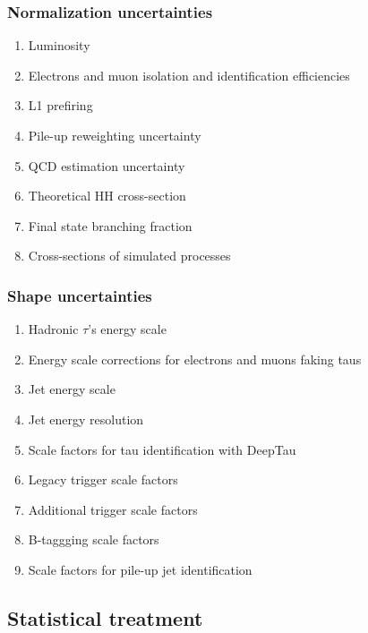 \documentclass[11pt]{article}
\begin{document}
\subsubsection{Normalization uncertainties}
\label{sec:org8d513f2}
\begin{enumerate}
\item Luminosity
\label{sec:org83c907c}
\item Electrons and muon isolation and identification efficiencies
\label{sec:orgbbc8293}
\item L1 prefiring
\label{sec:org8aad313}
\item Pile-up reweighting uncertainty
\label{sec:orgc70221e}
\item QCD estimation uncertainty
\label{sec:orgf3ca5a8}
\item Theoretical HH cross-section
\label{sec:orgd7659c6}
\item Final state branching fraction
\label{sec:org4a89f74}
\item Cross-sections of simulated processes
\label{sec:orgd0b0c73}
\end{enumerate}
\subsubsection{Shape uncertainties}
\label{sec:orgf576437}
\begin{enumerate}
\item Hadronic \(\tau\)'s energy scale
\label{sec:org02578de}
\item Energy scale corrections for electrons and muons faking taus
\label{sec:orgcac64fe}
\item Jet energy scale
\label{sec:org3418732}
\item Jet energy resolution
\label{sec:org00ff595}
\item Scale factors for tau identification with DeepTau
\label{sec:orgc155542}
\item Legacy trigger scale factors
\label{sec:org7705207}
\item Additional trigger scale factors
\label{sec:orgd9823f7}
\item B-taggging scale factors
\label{sec:org719a89e}
\item Scale factors for pile-up jet identification
\label{sec:org51f0e51}
\end{enumerate}
\subsection{Statistical treatment}
\label{sec:org3f034ba}
\end{document}
